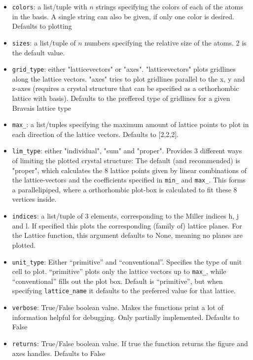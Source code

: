 \documentclass[a4paper,11pt]{article}
\numberwithin{equation}{section}
\begin{document}
	\begin{itemize}
		\item \texttt{colors}: a list/tuple with $ n $ strings specifying the colors of each of the atoms in the basis. A single string can also be given, if only one color is desired. Defaults to plotting 
		\item \texttt{sizes}: a list/tuple of $ n $ numbers specifying the relative size of the atoms. 2 is the default value.
		\item \texttt{grid\_type}: either "latticevectors" or "axes". "latticevectors" plots gridlines along the lattice vectors. "axes" tries to plot gridlines parallel to the x, y and z-axes (requires a crystal structure that can be specified as a orthorhombic lattice with basis). Defaults to the preffered type of gridlines for a given Bravais lattice type
		\item \texttt{max\_}: a list/tuples specifying the maximum amount of lattice points to plot in each direction of the lattice vectors. Defaults to [2,2,2].
		\item \texttt{lim\_type}: either "individual", "sum" and "proper". Provides 3 different ways of limiting the plotted crystal structure: The default (and recommended) is "proper", which calculates the 8 lattice points given by linear combinations of the lattice-vectors and the coefficients specified in \texttt{min\_} and \texttt{max\_}. This forms a parallelipiped, where a orthorhombic plot-box is calculated to fit these 8 vertices inside.
		\item \texttt{indices}: a list/tuple of 3 elements, corresponding to the Miller indices h, j and l. If specified this plots the corresponding (family of) lattice planes. For the Lattice function, this argument defaults to None, meaning no planes are plotted.
		\item \texttt{unit\_type}: Either ``primitive'' and ``conventional''. Specifies the type of unit cell to plot. ``primitive'' plots only the lattice vectors up to \texttt{max\_}, while ``conventional'' fills out the plot box. Default is ``primitive'', but when specifying \texttt{lattice\_name} it defaults to the preferred value for that lattice.
		\item \texttt{verbose}: True/False boolean value. Makes the functions print a lot of information helpful for debugging. Only partially implemented. Defaults to False
		\item \texttt{returns}: True/False boolean value. If true the function returns the figure and axes handles. Defaults to False
	\end{itemize}
\end{document}
